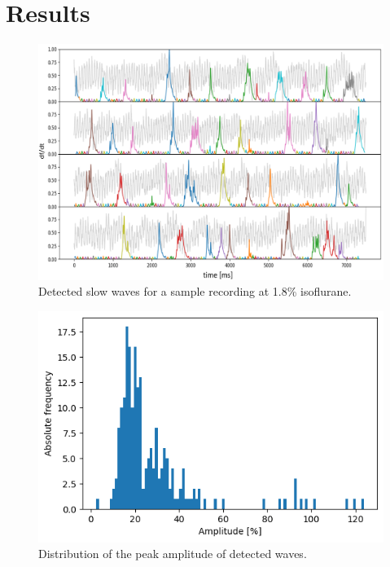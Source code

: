 
\chapter{Results} %

\label{Chapter4} %

\begin{figure}[!htb]
\centering
\includegraphics[width=\textwidth,height=\textheight,keepaspectratio]{Figures/slow_wave_segmentation}
\decoRule
\caption[Detected slow waves for a sample recording]{Detected slow waves for a sample recording at 1.8\% isoflurane.}
\label{fig:slow_wave_segmentation}
\end{figure}

\begin{figure}[!htb]
\centering
\includegraphics[width=\textwidth,height=\textheight,keepaspectratio]{Figures/selected_waves_distribution_of_peak_amplitude}
\decoRule
\caption[Distribution of the peak amplitude of detected waves]{Distribution of the peak amplitude of detected waves.}
\label{fig:selected_waves_distribution_of_peak_amplitude}
\end{figure}

